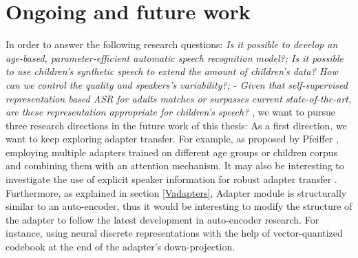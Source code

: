 \section{Ongoing and future work} %
\label{section:ongoing}
In order to answer the following research questions: \textit{Is it possible to develop an age-based, parameter-efficient automatic speech recognition model?; Is it possible to use children's synthetic speech to extend the amount of children's data? How can we control the quality and speakers’s variability?; - Given that self-supervised representation based ASR for adults matches or surpasses current state-of-the-art, are these representation appropriate for children’s speech? },
we want to pursue three research directions in the future work of this thesis: As a first direction, we want to keep exploring adapter transfer. For example, as proposed by Pfeiffer \cite{pfeiffer2020adapterfusion}, employing multiple adapters trained on different age groups or children corpus and combining them with an attention mechanism. It may also be interesting to investigate the use of explicit speaker information for robust adapter transfer \cite{gong2022layer}. Furthermore, as explained in section \ref{Vadapters}, Adapter module is structurally similar to an auto-encoder, thus it would be interesting to modify the structure of the adapter to follow the latest development in auto-encoder research. For instance, using neural discrete representations with the help of vector-quantized codebook\cite{van2017neural} at the end of the adapter's down-projection.

